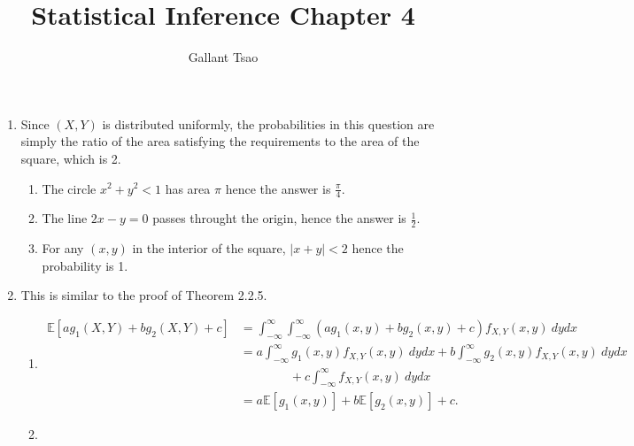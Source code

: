 \documentclass{article}
\title{Statistical Inference Chapter 4}
\author{Gallant Tsao}
\begin{document}
\maketitle

\begin{enumerate}
    \item Since $(X, Y)$ is distributed uniformly, the probabilities in this question are simply the 
    ratio of the area satisfying the requirements to the area of the square, which is 2.
    \begin{enumerate}
        \item The circle $x^2 + y^2 < 1$ has area $\pi$ hence the answer is $\frac{\pi}{4}$.
        \item The line $2x - y = 0$ passes throught the origin, hence the answer is $\frac{1}{2}$.
        \item For any $(x, y)$ in the interior of the square, $|x + y| < 2$ hence the probability is 1.
    \end{enumerate}

    \item This is similar to the proof of Theorem 2.2.5.
    \begin{enumerate}
        \item \begin{align*}
            \mathbb{E}[ag_1(X, Y) + bg_2(X, Y) + c] 
            &= \int_{-\infty}^{\infty} \int_{-\infty}^{\infty} 
            (ag_1(x, y) + bg_2(x, y) + c) f_{X, Y}(x, y) \ dydx \\
            &= a\int_{-\infty}^{\infty} g_1(x, y) f_{X, Y}(x, y)\ dydx 
            + b\int_{-\infty}^{\infty} g_2(x, y) f_{X, Y}(x, y) \ dydx \\
            &\qquad \qquad + c\int_{-\infty}^{\infty} f_{X, Y}(x, y) \ dydx \\
            &= a \mathbb{E}[g_1(x, y)] + b \mathbb{E}[g_2(x, y)] + c.
        \end{align*}

        \item 
    \end{enumerate}


\end{enumerate}
\end{document}
